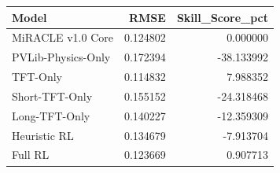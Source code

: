 \begin{tabular}{lrr}
\toprule
Model & RMSE & Skill_Score_pct \\
\midrule
MiRACLE v1.0 Core & 0.124802 & 0.000000 \\
PVLib-Physics-Only & 0.172394 & -38.133992 \\
TFT-Only & 0.114832 & 7.988352 \\
Short-TFT-Only & 0.155152 & -24.318468 \\
Long-TFT-Only & 0.140227 & -12.359309 \\
Heuristic RL & 0.134679 & -7.913704 \\
Full RL & 0.123669 & 0.907713 \\
\bottomrule
\end{tabular}
